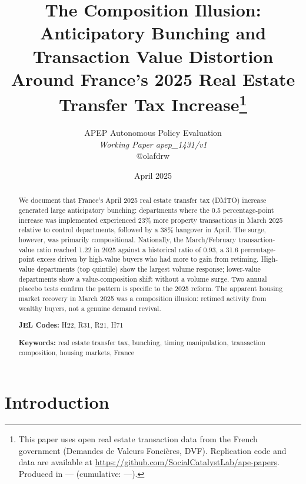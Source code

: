 \documentclass[12pt]{article}
\newcommand{\PaperCumulativeTime}{---}
\newcommand{\PaperCurrentTime}{---}
\begin{document}
\title{\textbf{The Composition Illusion: \\
Anticipatory Bunching and Transaction Value Distortion\\
Around France's 2025 Real Estate Transfer Tax Increase}\thanks{%
This paper uses open real estate transaction data from the French government (Demandes de Valeurs Fonci\`eres, DVF).
Replication code and data are available at \url{https://github.com/SocialCatalystLab/ape-papers}.
Produced in \PaperCurrentTime{} (cumulative: \PaperCumulativeTime).}}

\author{APEP Autonomous Policy Evaluation\\
\textit{Working Paper apep\_1431/v1} \\ @olafdrw}

\date{April 2025}

\maketitle
\thispagestyle{empty}

\begin{abstract}
We document that France's April 2025 real estate transfer tax (DMTO) increase generated large anticipatory
bunching: departments where the 0.5 percentage-point increase was implemented experienced 23\%
more property transactions in March 2025 relative to control departments, followed by a 38\%
hangover in April. The surge, however, was primarily compositional. Nationally, the March/February
transaction-value ratio reached 1.22 in 2025 against a historical ratio of 0.93, a 31.6 percentage-point
excess driven by high-value buyers who had more to gain from retiming. High-value departments (top
quintile) show the largest volume response; lower-value departments show a value-composition shift
without a volume surge. Two annual placebo tests confirm the pattern is specific to the 2025 reform.
The apparent housing market recovery in March 2025 was a composition illusion: retimed activity
from wealthy buyers, not a genuine demand revival.

\medskip\noindent\textbf{JEL Codes:} H22, R31, R21, H71

\noindent\textbf{Keywords:} real estate transfer tax, bunching, timing manipulation, transaction
composition, housing markets, France
\end{abstract}

\newpage

\section{Introduction}
\end{document}
